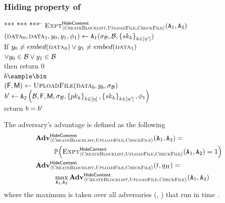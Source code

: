 \subsubsection{Hiding property of \contentToken}
%

	\begin{minipage}{0.5\columnwidth}
		\begin{tabbing}
			*** \= *** \= *** \= \kill
			$\Experiment{\hidingContentLabel}{\contentModSchemeDefn}(\adversary[1], \adversary[2])$ \\
			\> $(\clientData[0], \clientData[1], \genericCInputElmt{0}, \genericCInputElmt{1},\adversaryState{1}) \assign \adversary[1](\genericSig[\blocklist], \blocklist, 
	\setOfDishonestAuditorPrivkeys)$\\
			\> If $\genericCInputElmt{0} \neq \contentHash(\clientData[0]) \lor \genericCInputElmt{1} \neq \contentHash(\clientData[1])$ \\
			\> \> $\lor \genericCInputElmt{0} \in \blocklist \lor \genericCInputElmt{1} \in \blocklist$\\
			\> \> \> then return 0 \\
	        \> $\indBit \sample \bin$ \\
			\> $(\cOutputFile, \cOutputMeta) \assign \uploadFile(\clientData[\indBit], \genericCInputElmt{\indBit}, 
		\genericSig[\blocklist])$ \\
			\> $\advBit \assign \adversary[2]\left(\blocklist, \cOutputFile, \cOutputMeta, 
				\genericSig[\blocklist], \setOfAuditorPubkeys,
				\setOfDishonestAuditorPrivkeys, \adversaryState{1}\right)$\\
			\> return $b = b'$
		\end{tabbing}
	\end{minipage}

	The adversary's advantage is defined as the following 
	\begin{align*}
	& \Advantage{\hidingContentLabel}{\contentModSchemeDefn}(\adversary[1], \adversary[2])= \\ 
	& ~~\qquad \prob{\Experiment{\hidingContentLabel}{\contentModSchemeDefn}(\adversary[1], \adversary[2]) = 
		1} \\
	& \Advantage{\hidingContentLabel}{\contentModSchemeDefn}(\timeBound, \oracleQueries) = \\
	& ~~\qquad \max_{\adversary[1], \adversary[2]} \Advantage{\hidingContentLabel}{\contentModSchemeDefn}(\adversary[1], \adversary[2])
	\end{align*}
where the maximum is taken over all adversaries (\adversary[1], \adversary[2]) that run in time \timeBound. 

